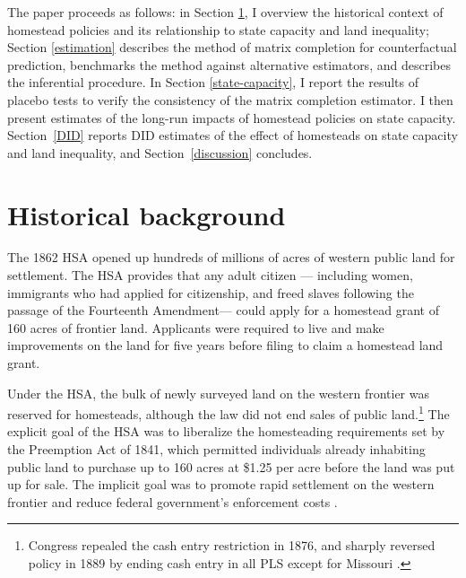\documentclass[hidelinks,12pt]{article}
\begin{document}
The paper proceeds as follows: in Section \ref{history}, I overview the historical context of homestead policies and its relationship to state capacity and land inequality; Section \ref{estimation} describes the method of matrix completion for counterfactual prediction, benchmarks the method against alternative estimators, and describes the inferential procedure. In Section \ref{state-capacity}, I report the results of placebo tests to verify the consistency of the matrix completion estimator. I then present estimates of the long-run impacts of homestead policies on state capacity. Section~\ref{DID} reports DID estimates of the effect of homesteads on state capacity and land inequality, and Section~\ref{discussion} concludes. 

\setcounter{section}{1} %
\section{Historical background} \label{history}

The 1862 HSA opened up hundreds of millions of acres of western public land for settlement. The HSA provides that any adult citizen --- including women, immigrants who had applied for citizenship, and freed slaves following the passage of the Fourteenth Amendment---  could apply for a homestead grant of 160 acres of frontier land. Applicants were required to live and make improvements on the land for five years before filing to claim a homestead land grant. 

Under the HSA, the bulk of newly surveyed land on the western frontier was reserved for homesteads, although the law did not end sales of public land.\footnote{Congress repealed the cash entry restriction in 1876, and sharply reversed policy in 1889 by ending cash entry in all PLS except for Missouri \citep{gates1940federal}.} The explicit goal of the HSA was to liberalize the homesteading requirements set by the Preemption Act of 1841, which permitted individuals already inhabiting public land to purchase up to 160 acres at \$1.25 per acre before the land was put up for sale. The implicit goal was to promote rapid settlement on the western frontier and reduce federal government's enforcement costs \citep{allen1991homesteading}. 
\end{document}
